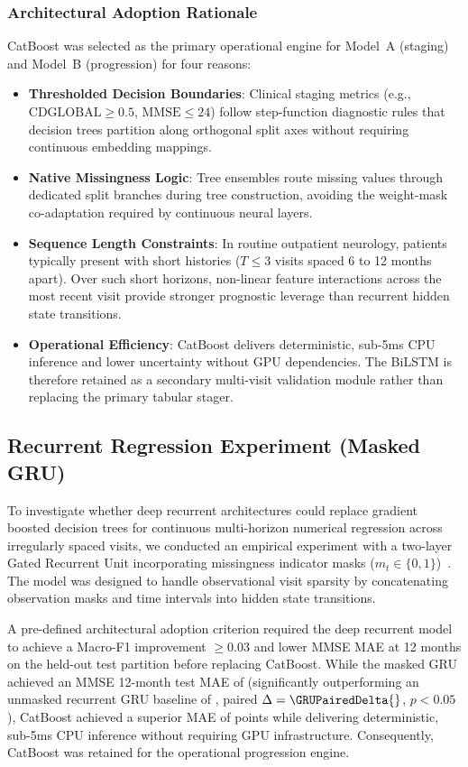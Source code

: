 \subsubsection{Architectural Adoption Rationale}
CatBoost was selected as the primary operational engine for Model~A (staging) and Model~B (progression) for four reasons:
\begin{itemize}
    \item \textbf{Thresholded Decision Boundaries}: Clinical staging metrics (e.g., $\text{CDGLOBAL} \ge 0.5$, $\text{MMSE} \le 24$) follow step-function diagnostic rules that decision trees partition along orthogonal split axes without requiring continuous embedding mappings.
    \item \textbf{Native Missingness Logic}: Tree ensembles route missing values through dedicated split branches during tree construction, avoiding the weight-mask co-adaptation required by continuous neural layers.
    \item \textbf{Sequence Length Constraints}: In routine outpatient neurology, patients typically present with short histories ($T \le 3$ visits spaced 6 to 12 months apart). Over such short horizons, non-linear feature interactions across the most recent visit provide stronger prognostic leverage than recurrent hidden state transitions.
    \item \textbf{Operational Efficiency}: CatBoost delivers deterministic, sub-5ms CPU inference and lower uncertainty without GPU dependencies. The BiLSTM is therefore retained as a secondary multi-visit validation module rather than replacing the primary tabular stager.
\end{itemize}

\subsection{Recurrent Regression Experiment (Masked GRU)}
To investigate whether deep recurrent architectures could replace gradient boosted decision trees for continuous multi-horizon numerical regression across irregularly spaced visits, we conducted an empirical experiment with a two-layer Gated Recurrent Unit incorporating missingness indicator masks ($m_t \in \{0, 1\}$)~\cite{che2018grud}. The model was designed to handle observational visit sparsity by concatenating observation masks and time intervals into hidden state transitions.

A pre-defined architectural adoption criterion required the deep recurrent model to achieve a Macro-F1 improvement $\ge 0.03$ and lower MMSE MAE at 12 months on the held-out test partition before replacing CatBoost. While the masked GRU achieved an MMSE 12-month test MAE of \GRUMaskedMAE{} (significantly outperforming an unmasked recurrent GRU baseline of \GRUUnmaskedMAE{}, paired $\Delta = \GRUPairedDelta{}$, $p < 0.05$), CatBoost achieved a superior MAE of \GBMProgressionMAE{} points while delivering deterministic, sub-5ms CPU inference without requiring GPU infrastructure. Consequently, CatBoost was retained for the operational progression engine.

